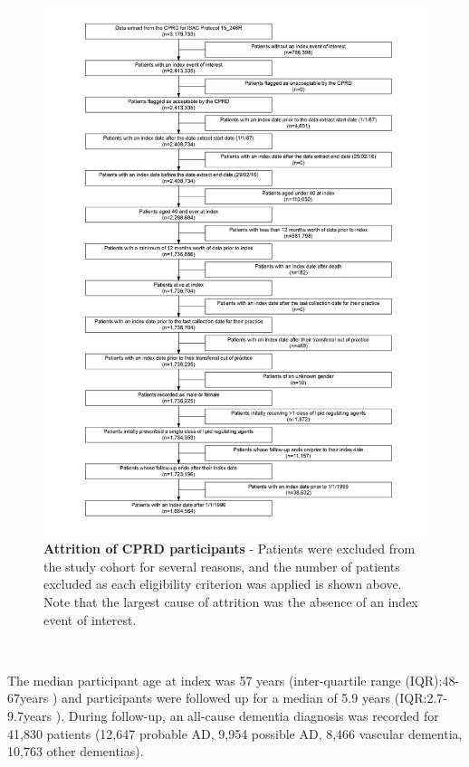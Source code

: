 \documentclass[a4paper, twoside]{templates/ociamthesis}
\begin{document}
\begin{figure}[H]
\includegraphics[width=1\linewidth]{figures/cprd-analysis/cohort_attrition} \caption[Attrition of CPRD participants]{\textbf{Attrition of CPRD participants} - Patients were excluded from the study cohort for several reasons, and the number of patients excluded as each eligibility criterion was applied is shown above. Note that the largest cause of attrition was the absence of an index event of interest.}\label{fig:cprdFlowchart}
\end{figure}

~

The median participant age at index was 57 years (inter-quartile range (IQR):48-67years ) and participants were followed up for a median of 5.9 years (IQR:2.7-9.7years ). During follow-up, an all-cause dementia diagnosis was recorded for 41,830 patients (12,647 probable AD, 9,954 possible AD, 8,466 vascular dementia, 10,763 other dementias).
\end{document}
